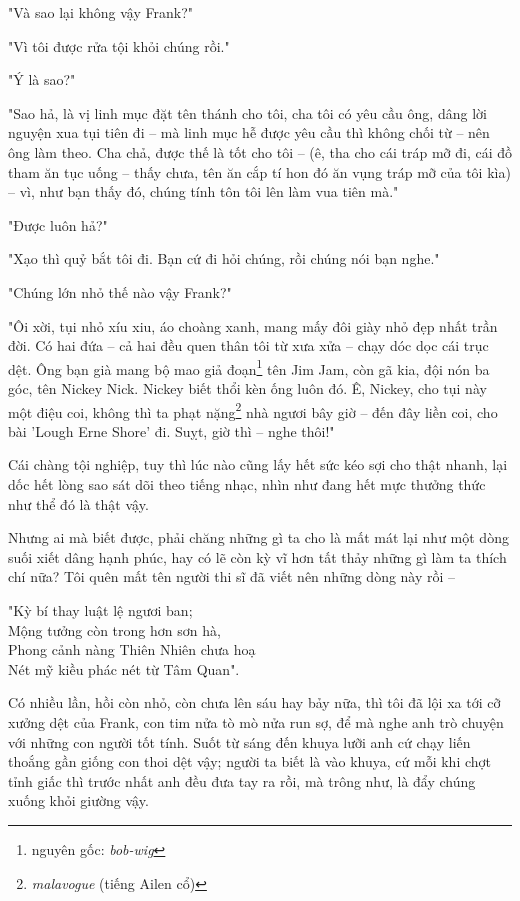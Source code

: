 "Và sao lại không vậy Frank?"

"Vì tôi được rửa tội khỏi chúng rồi."

"Ý là sao?"

"Sao hả, là vị linh mục đặt tên thánh cho tôi, cha tôi có yêu cầu ông, dâng lời nguyện xua tụi tiên đi – mà linh mục hễ được yêu cầu thì không chối từ – nên ông làm theo. Cha chả, được thế là tốt cho tôi – (ê, tha cho cái tráp mỡ đi, cái đồ tham ăn tục uống – thấy chưa, tên ăn cắp tí hon đó ăn vụng tráp mỡ của tôi kìa) – vì, như bạn thấy đó, chúng tính tôn tôi lên làm vua tiên mà."

"Được luôn hả?"

"Xạo thì quỷ bắt tôi đi. Bạn cứ đi hỏi chúng, rồi chúng nói bạn nghe."

"Chúng lớn nhỏ thế nào vậy Frank?"

"Ôi xời, tụi nhỏ xíu xiu, áo choàng xanh, mang mấy đôi giày nhỏ đẹp nhất trần đời. Có hai đứa – cả hai đều quen thân tôi từ xưa xửa – chạy dóc dọc cái trục dệt. Ông bạn già mang bộ mao giả đoạn\footnote{nguyên gốc: \textit{bob-wig}} tên Jim Jam, còn gã kia, đội nón ba góc, tên Nickey Nick. Nickey biết thổi kèn ống luôn đó. Ê, Nickey, cho tụi này một điệu coi, không thì ta phạt nặng\footnote{\textit{malavogue} (tiếng Ailen cổ)} nhà ngươi bây giờ – đến đây liền coi, cho bài 'Lough Erne Shore' đi. Suỵt, giờ thì – nghe thôi!"

Cái chàng tội nghiệp, tuy thì lúc nào cũng lấy hết sức kéo sợi cho thật nhanh, lại dốc hết lòng sao sát dõi theo tiếng nhạc, nhìn như đang hết mực thưởng thức như thể đó là thật vậy.

Nhưng ai mà biết được, phải chăng những gì ta cho là mất mát lại như một dòng suối xiết dâng hạnh phúc, hay có lẽ còn kỳ vĩ hơn tất thảy những gì làm ta thích chí nữa? Tôi quên mất tên người thi sĩ đã viết nên những dòng này rồi –

\begin{center}
  "Kỳ bí thay luật lệ ngươi ban;\\
  Mộng tưởng còn trong hơn sơn hà,\\
  Phong cảnh nàng Thiên Nhiên chưa hoạ\\
  Nét mỹ kiều phác nét từ Tâm Quan".\\
\end{center}

Có nhiều lần, hồi còn nhỏ, còn chưa lên sáu hay bảy nữa, thì tôi đã lội xa tới cỡ xưởng dệt của Frank, con tim nửa tò mò nửa run sợ, để mà nghe anh trò chuyện với những con người tốt tính. Suốt từ sáng đến khuya lưỡi anh cứ chạy liến thoắng gần giống con thoi dệt vậy; người ta biết là vào khuya, cứ mỗi khi chợt tỉnh giấc thì trước nhất anh đều đưa tay ra rồi, mà trông như, là đẩy chúng xuống khỏi giường vậy.


